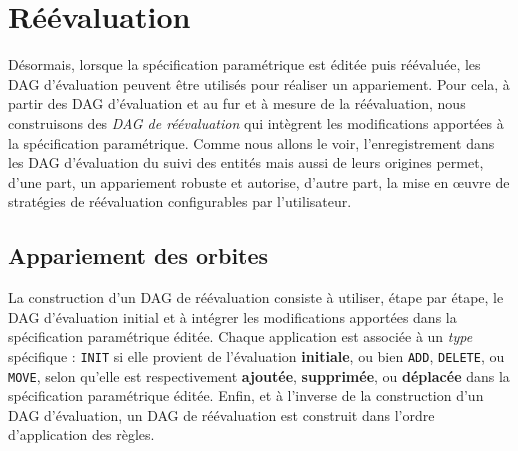 

\section{Réévaluation}
\label{sec:reevaluation-base-regles-reevaluation}



Désormais, lorsque la spécification paramétrique est éditée puis réévaluée, les DAG d'évaluation peuvent être utilisés pour réaliser un appariement. %
Pour cela, à partir des DAG d'évaluation et au fur et à mesure de la réévaluation, nous construisons des \emph{DAG de réévaluation} qui intègrent les modifications apportées à la spécification paramétrique. %
Comme nous allons le voir, l'enregistrement dans les DAG d'évaluation du suivi des entités mais aussi de leurs origines permet, d'une part, un appariement robuste et autorise, d'autre part, la mise en \oe uvre de stratégies de réévaluation configurables par l'utilisateur. %



\subsection{Appariement des orbites}
\label{sec:reevaluation-base-regles-reevaluation-dag-reevaluation}

La construction d'un DAG de réévaluation consiste à utiliser, étape par étape, le DAG d'évaluation initial et à intégrer les modifications apportées dans la spécification paramétrique éditée. Chaque application est associée à un \emph{type} spécifique : \texttt{INIT} si elle provient de l'évaluation \textbf{initiale}, ou bien \texttt{ADD}, \texttt{DELETE}, ou \texttt{MOVE}, selon qu'elle est respectivement \textbf{ajoutée}, \textbf{supprimée}, ou \textbf{déplacée} dans la spécification paramétrique éditée. Enfin, et à l'inverse de la construction d'un DAG d'évaluation, un DAG de réévaluation est construit dans l'ordre d'application des règles. %

